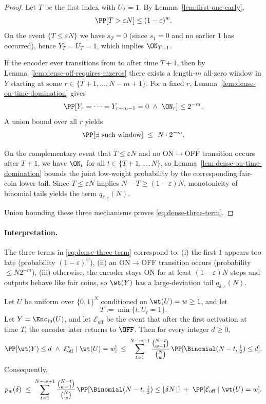 \begin{proof}
Let $T$ be the first index with $U_T=1$. By Lemma~\ref{lem:first-one-early},
\[
\PP[T>\varepsilon N]\le (1-\varepsilon)^w.
\]
On the event $\{T\le \varepsilon N\}$ we have $s_T=0$ (since $s_1=0$ and no earlier $1$ has occurred),
hence $Y_T=U_T=1$, which implies $\ON_{T+1}$.

If the encoder ever transitions from \ON to \OFF after time $T+1$, then by Lemma~\ref{lem:dense-off-requires-mzeros}
there exists a length-$m$ all-zero window in $Y$ starting at some $r\in\{T+1,\dots,N-m+1\}$.
For a fixed $r$, Lemma~\ref{lem:dense-on-time-domination} gives
\[
\PP[Y_r=\cdots=Y_{r+m-1}=0 \ \wedge\ \ON_r]\le 2^{-m}.
\]
A union bound over all $r$ yields
\[
\PP[\exists\ \text{such window}] \ \le\ N\cdot 2^{-m}.
\]

On the complementary event that $T\le \varepsilon N$ and no ON$\to$OFF transition occurs after $T+1$,
we have $\ON_t$ for all $t\in\{T+1,\dots,N\}$, so Lemma~\ref{lem:dense-on-time-domination} bounds the joint
low-weight probability by the corresponding fair-coin lower tail.
Since $T\le \varepsilon N$ implies $N-T\ge (1-\varepsilon)N$, monotonicity of binomial tails yields the term
$q_{\delta,\varepsilon}(N)$.

Union bounding these three mechanisms proves \eqref{eq:dense-three-term}.
\end{proof}

\paragraph{Interpretation.}
The three terms in \eqref{eq:dense-three-term} correspond to:
(i) the first $1$ appears too late (probability $(1-\varepsilon)^w$),
(ii) an ON$\to$OFF transition occurs (probability $\le N2^{-m}$),
(iii) otherwise, the encoder stays ON for at least $(1-\varepsilon)N$ steps and outputs behave like fair coins, so
$\wt(Y)$ has a large-deviation tail $q_{\delta,\varepsilon}(N)$.

\begin{lemma}
\label{lem:dense-first-start-nooff-tail}
Let \(U\) be uniform over \(\{0,1\}^N\) conditioned on \(\wt(U)=w\ge 1\), and let
\[
T:=\min\{t:U_t=1\}.
\]
Let \(Y=\Enc_{\mathrm{in}}(U)\), and let \(\mathcal{E}_{\mathrm{off}}\) be the event that after the first activation
at time \(T\), the encoder later returns to \(\OFF\). Then for every integer \(d\ge 0\),
\begin{equation}
\label{eq:dense-first-start-nooff-tail}
\PP[\wt(Y)\le d\ \wedge\ \mathcal{E}_{\mathrm{off}}^c\mid \wt(U)=w]
\;\le\;
\sum_{t=1}^{N-w+1}
\frac{\binom{N-t}{w-1}}{\binom{N}{w}}\,
\PP[\Binomial(N-t,\tfrac12)\le d].
\end{equation}
Consequently,
\begin{equation}
\label{eq:dense-first-start-with-off-remainder}
p_w(\delta)
\;\le\;
\sum_{t=1}^{N-w+1}
\frac{\binom{N-t}{w-1}}{\binom{N}{w}}\,
\PP[\Binomial(N-t,\tfrac12)\le \lfloor\delta N\rfloor]
\;+\;
\PP[\mathcal{E}_{\mathrm{off}}\mid \wt(U)=w].
\end{equation}
\end{lemma}

